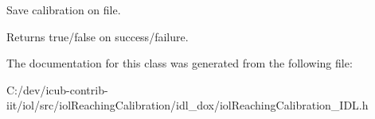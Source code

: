 Save calibration on file. 

\begin{DoxyReturn}{Returns}
true/false on success/failure. 
\end{DoxyReturn}


The documentation for this class was generated from the following file\+:\begin{DoxyCompactItemize}
\item 
C\+:/dev/icub-\/contrib-\/iit/iol/src/iol\+Reaching\+Calibration/idl\+\_\+dox/iol\+Reaching\+Calibration\+\_\+\+I\+D\+L.\+h\end{DoxyCompactItemize}
